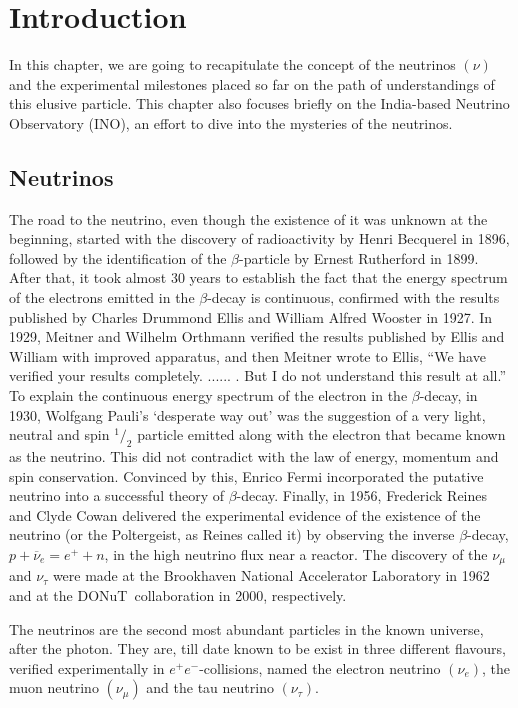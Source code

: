 
\chapter{Introduction}
In this chapter, we are going to recapitulate the concept of the
neutrinos $\left(\nu\right)$ and the experimental milestones placed
so far on the path of understandings of this elusive particle. This
chapter also focuses briefly on the India-based Neutrino Observatory
(INO), an effort to dive into the mysteries of the neutrinos.

\section{Neutrinos}
The road to the neutrino\cite{roadtoneut}, even though the existence
of it was unknown at the beginning, started with the discovery of
radioactivity by Henri Becquerel in 1896\cite{becquerel1896}, followed
by the identification of the $\beta$-particle by Ernest Rutherford in
1899\cite{rutherford1899}. After that, it took almost 30 years to
establish the fact that the energy spectrum of the electrons emitted
in the $\beta$-decay is continuous, confirmed with the results
published by Charles Drummond Ellis and William Alfred Wooster
in 1927\cite{ellis1927}. In 1929, Meitner and Wilhelm Orthmann
verified the results published by Ellis and William with improved
apparatus\cite{meitner1930}, and then Meitner wrote to Ellis,
``We have verified your results completely. ...... . But I do not understand this result at all.''\cite{lettertoCD}
To explain the continuous energy spectrum of the electron in the
$\beta$-decay, in 1930, Wolfgang Pauli's `desperate way out' was the
suggestion of a very light, neutral and spin $^1/_2$ particle emitted
along with the electron that became known as the neutrino. This did
not contradict with the law of energy, momentum and spin conservation.
Convinced by this, Enrico Fermi incorporated the putative neutrino
into a successful theory of $\beta$-decay. Finally, in 1956, Frederick
Reines and Clyde Cowan delivered the experimental evidence of the
existence of the neutrino (or the Poltergeist, as Reines called it)
by observing the inverse $\beta$-decay, $p+\overline{\nu}_e=e^++n$,
in the high neutrino flux near a reactor\cite{reines1956}.
The discovery of the $\nu_{\mu}$ and $\nu_{\tau}$ were made at
the Brookhaven National Accelerator Laboratory in
1962\cite{muonneut1962} and at the DONuT~collaboration in
2000\cite{tauneut2001}, respectively.

The neutrinos are the second most abundant particles in the known
universe, after the photon. They are, till date known to be exist
in three different flavours, verified experimentally in
\mbox{$e^+e^-$-collisions\cite{numberneut}}, named the electron
neutrino $\left(\nu_e\right)$, the muon neutrino
$\left(\nu_{\mu}\right)$ and the tau neutrino $\left(\nu_{\tau}\right)$.

